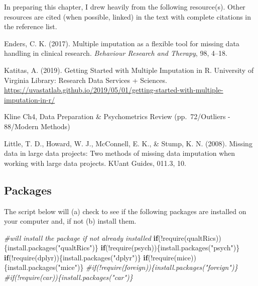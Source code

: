 \documentclass[
  english,
]{book}
\newenvironment{Shaded}{\begin{snugshade}}{\end{snugshade}}
\newcommand{\CommentTok}[1]{\textcolor[rgb]{0.56,0.35,0.01}{\textit{#1}}}
\newcommand{\ControlFlowTok}[1]{\textcolor[rgb]{0.13,0.29,0.53}{\textbf{#1}}}
\newcommand{\FunctionTok}[1]{\textcolor[rgb]{0.00,0.00,0.00}{#1}}
\newcommand{\NormalTok}[1]{#1}
\newcommand{\SpecialCharTok}[1]{\textcolor[rgb]{0.00,0.00,0.00}{#1}}
\newcommand{\StringTok}[1]{\textcolor[rgb]{0.31,0.60,0.02}{#1}}
\begin{document}
In preparing this chapter, I drew heavily from the following resource(s). Other resources are cited (when possible, linked) in the text with complete citations in the reference list.

Enders, C. K. (2017). Multiple imputation as a flexible tool for missing data handling in clinical research. \emph{Behaviour Research and Therapy}, 98, 4--18.

Katitas, A. (2019). Getting Started with Multiple Imputation in R. University of Virginia Library: Research Data Services + Sciences. \url{https://uvastatlab.github.io/2019/05/01/getting-started-with-multiple-imputation-in-r/}

Kline Ch4, Data Preparation \& Psychometrics Review (pp.~72/Outliers - 88/Modern Methods)

Little, T. D., Howard, W. J., McConnell, E. K., \& Stump, K. N. (2008). Missing data in large data projects: Two methods of missing data imputation when working with large data projects. KUant Guides, 011.3, 10.

\hypertarget{packages-4}{%
\subsection{Packages}\label{packages-4}}

The script below will (a) check to see if the following packages are installed on your computer and, if not (b) install them.

\begin{Shaded}
\begin{Highlighting}[]
\CommentTok{\#will install the package if not already installed}
\ControlFlowTok{if}\NormalTok{(}\SpecialCharTok{!}\FunctionTok{require}\NormalTok{(qualtRics))\{}\FunctionTok{install.packages}\NormalTok{(}\StringTok{"qualtRics"}\NormalTok{)\}}
\ControlFlowTok{if}\NormalTok{(}\SpecialCharTok{!}\FunctionTok{require}\NormalTok{(psych))\{}\FunctionTok{install.packages}\NormalTok{(}\StringTok{"psych"}\NormalTok{)\}}
\ControlFlowTok{if}\NormalTok{(}\SpecialCharTok{!}\FunctionTok{require}\NormalTok{(dplyr))\{}\FunctionTok{install.packages}\NormalTok{(}\StringTok{"dplyr"}\NormalTok{)\}}
\ControlFlowTok{if}\NormalTok{(}\SpecialCharTok{!}\FunctionTok{require}\NormalTok{(mice))\{}\FunctionTok{install.packages}\NormalTok{(}\StringTok{"mice"}\NormalTok{)\}}
\CommentTok{\#if(!require(foreign))\{install.packages("foreign")\}}
\CommentTok{\#if(!require(car))\{install.packages("car")\}}
\end{Highlighting}
\end{Shaded}
\end{document}
